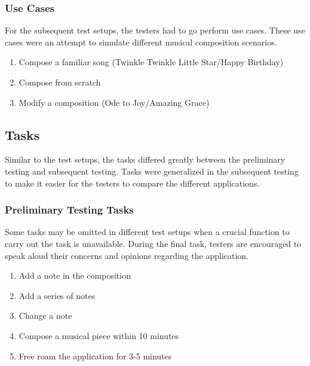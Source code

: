 \subsubsection{Use Cases}
\label{sec:use-cases}

For the subsequent test setups, the testers had to go perform use cases. These use cases were an attempt to simulate different musical composition scenarios. 

\begin{enumerate}
    \item Compose a familiar song (Twinkle Twinkle Little Star/Happy Birthday)
    \item Compose from scratch
    \item Modify a composition (Ode to Joy/Amazing Grace)
\end{enumerate}


\subsection{Tasks}
\label{sec:tasks}

Similar to the test setups, the tasks differed greatly between the preliminary testing and subsequent testing. Tasks were generalized in the subsequent testing to make it easier for the testers to compare the different applications.

\subsubsection{Preliminary Testing Tasks}
\label{sec:preliminary-tasks}

Some tasks may be omitted in different test setups when a crucial function to carry out the task is unavailable. During the final task, testers are encouraged to speak aloud their concerns and opinions regarding the application.

\begin{enumerate}
\item Add a note in the composition
\item Add a series of notes
\item Change a note
\item Compose a musical piece within 10 minutes
\item Free roam the application for 3-5 minutes
\end{enumerate}

